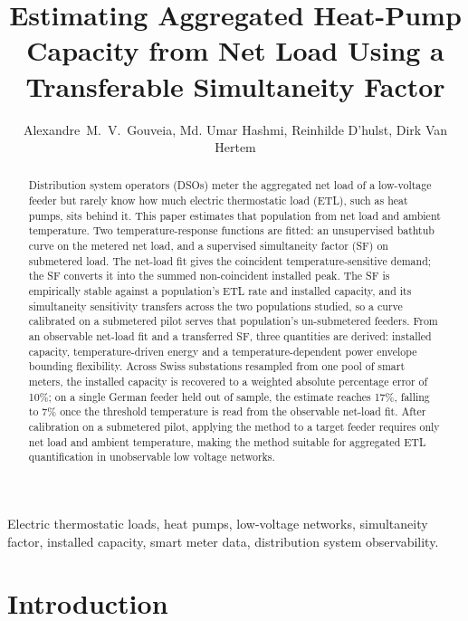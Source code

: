 \documentclass[9pt,journal,a4]{IEEEtran}
\begin{document}
\title{Estimating Aggregated Heat-Pump Capacity from Net Load Using a Transferable Simultaneity Factor}

\author{Alexandre~M.~V.~Gouveia, Md. Umar Hashmi, Reinhilde D'hulst, Dirk Van Hertem}

\maketitle

\begin{abstract}
Distribution system operators (DSOs) meter the aggregated net load of a low-voltage feeder but rarely know how much electric thermostatic load (ETL), such as heat pumps, sits behind it. This paper estimates that population from net load and ambient temperature. Two temperature-response functions are fitted: an unsupervised bathtub curve on the metered net load, and a supervised simultaneity factor (SF) on submetered load. The net-load fit gives the coincident temperature-sensitive demand; the SF converts it into the summed non-coincident installed peak. The SF is empirically stable against a population's ETL rate and installed capacity, and its simultaneity sensitivity transfers across the two populations studied, so a curve calibrated on a submetered pilot serves that population's un-submetered feeders. From an observable net-load fit and a transferred SF, three quantities are derived: installed capacity, temperature-driven energy and a temperature-dependent power envelope bounding flexibility. Across Swiss substations resampled from one pool of smart meters, the installed capacity is recovered to a weighted absolute percentage error of 10\%; on a single German feeder held out of sample, the estimate reaches 17\%, falling to 7\% once the threshold temperature is read from the observable net-load fit. After calibration on a submetered pilot, applying the method to a target feeder requires only net load and ambient temperature, making the method suitable for aggregated ETL quantification in unobservable low voltage networks.
\end{abstract}

\begin{IEEEkeywords}
Electric thermostatic loads, heat pumps, low-voltage networks, simultaneity factor, installed capacity, smart meter data, distribution system observability.
\end{IEEEkeywords}


\section{Introduction}
\label{sec:intro}
\end{document}
